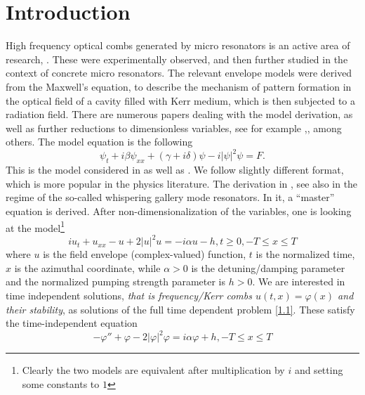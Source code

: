 \documentclass[12pt]{amsart}
\theoremstyle{definition}
\theoremstyle{remark}
\numberwithin{equation}{section}
\renewcommand{\(}{\left(}
\renewcommand{\)}{\right)}
\renewcommand{\[}{\left[}
\renewcommand{\]}{\right]}
\newcommand{\al}{\alpha}
\newcommand{\be}{\beta}
\newcommand{\ga}{\gamma}
\newcommand{\de}{\delta}
\newcommand{\vp}{\varphi}
\begin{document}
\maketitle



\section{Introduction}
High frequency optical combs generated by  micro resonators  is an active area of research, \cite{CY, KHD, LL1, Matsko,MR}. These were experimentally observed, \cite{Holz} and then further studied in the context of concrete micro resonators.
The relevant envelope models were derived from the Maxwell's equation, \cite{LL1} to describe the mechanism of pattern formation in the optical field of a cavity filled with Kerr medium, which is then subjected to a radiation field.  There are numerous papers dealing with the model derivation, as well as further reductions to dimensionless variables, see for example \cite{CM},\cite{LL1}, \cite{MR} among others. The model equation is the following 
\begin{equation}
\label{mar} 
\psi_t+i \be \psi_{xx}+(\ga+i \de) \psi - i |\psi|^2 \psi=F.
\end{equation}
This is the model considered in \cite{DH, DH1} as well as \cite{Ts1, Ts2}. 
We follow slightly different format, which is more popular in the physics literature.  The derivation in \cite{Matsko}, see also \cite{Mat1} in the regime of the so-called whispering gallery mode resonators.   In it, a ``master'' equation is derived.  After non-dimensionalization of the variables, one is  looking at the model\footnote{Clearly the two models are equivalent after multiplication by $i$ and setting some constants to $1$}  
\begin{equation}
\label{1.1}
  iu_t+u_{xx}-u+2|u|^2u=-i\alpha u-h, t\geq 0, -T\leq x\leq T
\end{equation}
where $u$ is the field envelope (complex-valued) function, $t$ is the normalized time, $x$ is the azimuthal coordinate, while $\al>0$ is  the detuning/damping  parameter  and the normalized  pumping  strength parameter is $h>0$.  We are interested in time independent solutions,
{\it 	that is frequency/Kerr combs   $u(t,x)=\vp(x)$ and their stability}, as solutions of the full time dependent problem \eqref{1.1}.  These satisfy the time-independent equation
\begin{equation}
\label{1.15}
-\vp''+\vp - 2|\vp|^2\vp=i\alpha \vp+h ,  -T\leq x\leq T
\end{equation}
\end{document}
